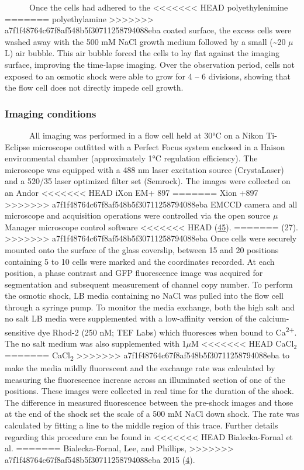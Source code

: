~ ~ ~
~Once
the
cells
had
adhered
to the
<<<<<<< HEAD
polyethylenimine
=======
polyethylamine
>>>>>>> a7f1f48764c67f8af548b5f30711258794088eba
coated
surface,
the
excess
cells
were
washed
away
with
the
500 mM
NaCl
growth
medium
followed
by a
small
(\textasciitilde{}20
\(\mu\)L)
air
bubble.
This
air
bubble
forced
the
cells
to lay
flat
against
the
imaging
surface,
improving
the
time-lapse
imaging.
Over
the
observation
period,
cells
not
exposed
to an
osmotic
shock
were
able
to
grow
for 4
-- 6
divisions,
showing
that
the
flow
cell
does
not
directly
impede
cell
growth.

\subsubsection{Imaging
conditions}\label{imaging-conditions}

~ ~ ~
~All
imaging
was
performed
in a
flow
cell
held
at
30°C
on a
Nikon
Ti-Eclipse
microscope
outfitted
with a
Perfect
Focus
system
enclosed
in a
Haison
environmental
chamber
(approximately
1°C
regulation
efficiency).
The
microscope
was
equipped
with a
488 nm
laser
excitation
source
(CrystaLaser)
and a
520/35
laser
optimized
filter
set
(Semrock).
The
images
were
collected
on an
Andor
<<<<<<< HEAD
iXon
EM+
897
=======
Xion
+897
>>>>>>> a7f1f48764c67f8af548b5f30711258794088eba
EMCCD
camera
and
all
microscope
and
acquisition
operations
were
controlled
via
the
open
source
\(\mu\)Manager
microscope
control
software
<<<<<<< HEAD
(\protect\hyperlink{ref-edelstein2014}{45}).
=======
(27).
>>>>>>> a7f1f48764c67f8af548b5f30711258794088eba
Once
cells
were
securely
mounted
onto
the
surface
of the
glass
coverslip,
between
15 and
20
positions
containing
5 to
10
cells
were
marked
and
the
coordinates
recorded.
At
each
position,
a
phase
contrast
and
GFP
fluorescence
image
was
acquired
for
segmentation
and
subsequent
measurement
of
channel
copy
number.
To
perform
the
osmotic
shock,
LB
media
containing
no
NaCl
was
pulled
into
the
flow
cell
through
a
syringe
pump.
To
monitor
the
media
exchange,
both
the
high
salt
and no
salt
LB
media
were
supplemented
with a
low-affinity
version
of the
calcium-sensitive
dye
Rhod-2
(250
nM;
TEF
Labs)
which
fluoresces
when
bound
to
Ca\textsuperscript{2+}.
The no
salt
medium
was
also
supplemented
with
1\(\mu\)M
<<<<<<< HEAD
CaCl\(_2\)
=======
CaCl\textsubscript{2}
>>>>>>> a7f1f48764c67f8af548b5f30711258794088eba
to
make
the
media
mildly
fluorescent
and
the
exchange
rate
was
calculated
by
measuring
the
fluorescence
increase
across
an
illuminated
section
of one
of the
positions.
These
images
were
collected
in
real
time
for
the
duration
of the
shock.
The
difference
in
measured
fluorescence
between
the
pre-shock
images
and
those
at the
end of
the
shock
set
the
scale
of a
500 mM
NaCl
down
shock.
The
rate
was
calculated
by
fitting
a line
to the
middle
region
of
this
trace.
Further
details
regarding
this
procedure
can be
found
in
<<<<<<< HEAD
Bialecka-Fornal
et al.
=======
Bialecka-Fornal,
Lee,
and
Phillips,
>>>>>>> a7f1f48764c67f8af548b5f30711258794088eba
2015
(\protect\hyperlink{ref-bialecka-fornal2015}{4}).

